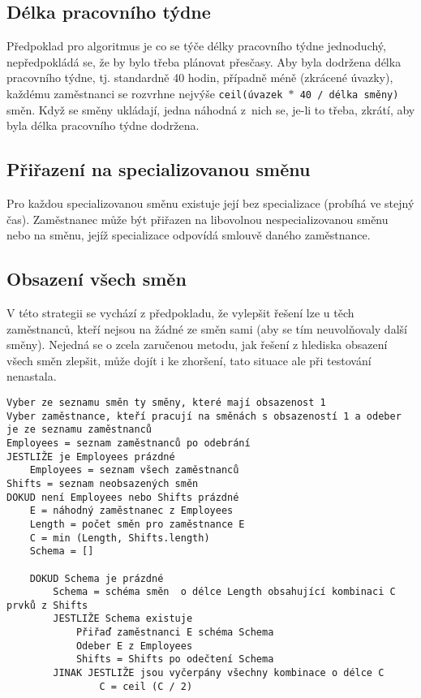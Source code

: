 \documentclass[twoside]{ctuthesis}
\begin{document}
\subsection{Délka pracovního týdne}
Předpoklad pro algoritmus je co se týče délky pracovního týdne jednoduchý, nepředpokládá se, že by bylo třeba plánovat přesčasy. Aby byla dodržena délka pracovního týdne, tj. standardně 40 hodin, případně méně (zkrácené úvazky), každému zaměstnanci se rozvrhne nejvýše \texttt{ceil(úvazek $\ast$ 40 / délka směny)} směn. Když se směny ukládají, jedna náhodná z~nich se, je-li to třeba, zkrátí, aby byla délka pracovního týdne dodržena.

\subsection{Přiřazení na specializovanou směnu}

Pro každou specializovanou směnu existuje její  bez specializace (probíhá ve stejný čas). Zaměstnanec může být přiřazen na libovolnou nespecializovanou směnu nebo na směnu, jejíž specializace odpovídá smlouvě daného zaměstnance.

\subsection{Obsazení všech směn}
V této strategii se vychází z předpokladu, že vylepšit řešení lze u těch zaměstnanců, kteří nejsou na žádné ze směn sami (aby se tím neuvolňovaly další směny). Nejedná se o zcela zaručenou metodu, jak řešení z hlediska obsazení všech směn zlepšit, může dojít i ke zhoršení, tato situace ale při testování nenastala.

\begin{lstlisting}[caption={Pseudokód pro vylepšování obsazení všech směn}]
Vyber ze seznamu směn ty směny, které mají obsazenost 1
Vyber zaměstnance, kteří pracují na směnách s obsazeností 1 a odeber je ze seznamu zaměstnanců
Employees = seznam zaměstnanců po odebrání
JESTLIŽE je Employees prázdné
	Employees = seznam všech zaměstnanců
Shifts = seznam neobsazených směn
DOKUD není Employees nebo Shifts prázdné
	E = náhodný zaměstnanec z Employees
	Length = počet směn pro zaměstnance E
	C = min (Length, Shifts.length)
	Schema = []

	DOKUD Schema je prázdné
		Schema = schéma směn  o délce Length obsahující kombinaci C prvků z Shifts
		JESTLIŽE Schema existuje
			Přiřaď zaměstnanci E schéma Schema
			Odeber E z Employees
			Shifts = Shifts po odečtení Schema
		JINAK JESTLIŽE jsou vyčerpány všechny kombinace o délce C
				C = ceil (C / 2)
\end{lstlisting}
\end{document}

